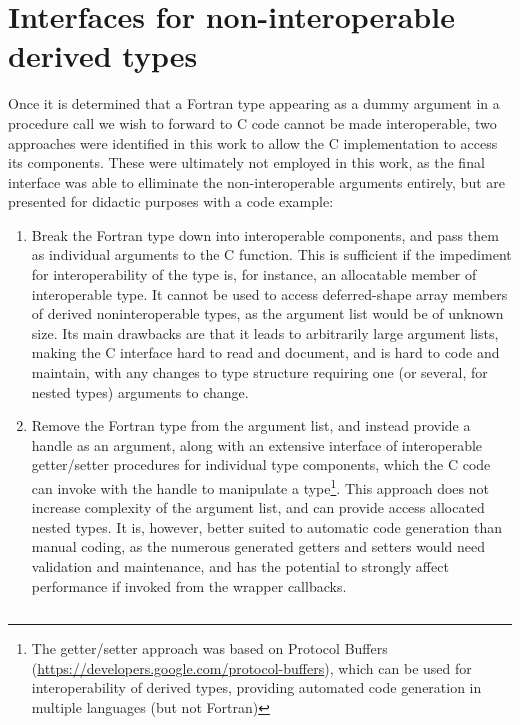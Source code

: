 \chapter{Interfaces for non-interoperable derived types} \label{appendix} \label{sec:derived_type_interface}

Once it is determined that a Fortran type appearing as a dummy argument in a procedure call we wish to forward to C code cannot be made interoperable, two approaches were identified in this work to allow the C implementation to access its components. These were ultimately not employed in this work, as the final interface was able to elliminate the non-interoperable arguments entirely, but are presented for didactic purposes with a code example:
\begin{enumerate}
    \item Break the Fortran type down into interoperable components, and pass them as individual arguments to the C function. This is sufficient if the impediment for interoperability of the type is, for instance, an allocatable member of interoperable type. It cannot be used to access deferred-shape array members of derived noninteroperable types, as the argument list would be of unknown size. Its main drawbacks are that it leads to arbitrarily large argument lists, making the C interface hard to read and document, and is hard to code and maintain, with any changes to type structure requiring one (or several, for nested types) arguments to change.
    \item Remove the Fortran type from the argument list, and instead provide a handle as an argument, along with an extensive interface of interoperable getter/setter procedures for individual type components, which the C code can invoke with the handle to manipulate a type\footnote{The getter/setter approach was based on Protocol Buffers (\url{https://developers.google.com/protocol-buffers}), which can be used for interoperability of derived types, providing automated code generation in multiple languages (but not Fortran)}. This approach does not increase complexity of the argument list, and can provide access allocated nested types. It is, however, better suited to automatic code generation than manual coding, as the numerous generated getters and setters would need validation and maintenance, and has the potential to strongly affect performance if invoked from the wrapper callbacks.
\end{enumerate}

\begin{code}
	\inputminted[fontsize=\footnotesize]{Fortran}{src/snippets/derived_type_access.f90}	
\end{code}